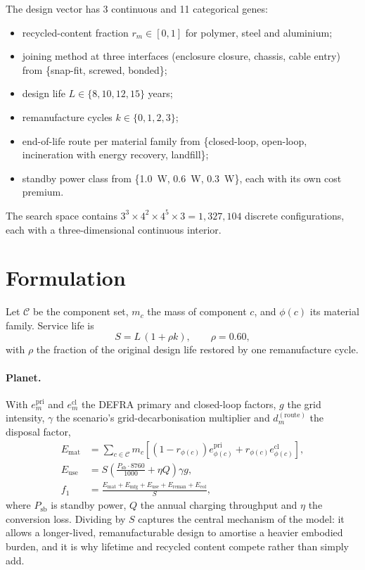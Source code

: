 \documentclass[11pt,a4paper]{article}
\begin{document}
The design vector has 3 continuous and 11 categorical genes:

\begin{itemize}
\item recycled-content fraction $r_m \in [0,1]$ for polymer, steel and
aluminium;
\item joining method at three interfaces (enclosure closure, chassis, cable
entry) from \{snap-fit, screwed, bonded\};
\item design life $L \in \{8, 10, 12, 15\}$ years;
\item remanufacture cycles $k \in \{0,1,2,3\}$;
\item end-of-life route per material family from \{closed-loop, open-loop,
incineration with energy recovery, landfill\};
\item standby power class from \{\SI{1.0}{\watt}, \SI{0.6}{\watt},
\SI{0.3}{\watt}\}, each with its own cost premium.
\end{itemize}

The search space contains $3^3 \times 4^2 \times 4^5 \times 3 =
1,327,104$ discrete configurations, each with a
three-dimensional continuous interior.

\FloatBarrier
\section{Formulation}

Let $\mathcal{C}$ be the component set, $m_c$ the mass of component $c$, and
$\phi(c)$ its material family. Service life is
\begin{equation}
S = L\,(1 + \rho k), \qquad \rho = 0.60,
\end{equation}
with $\rho$ the fraction of the original design life restored by one
remanufacture cycle.

\paragraph{Planet.} With $e^{\mathrm{pri}}_m$ and $e^{\mathrm{cl}}_m$ the DEFRA
primary and closed-loop factors, $g$ the grid intensity, $\gamma$ the
scenario's grid-decarbonisation multiplier and $d_m^{(\text{route})}$ the
disposal factor,
\begin{align}
E_{\text{mat}} &= \sum_{c \in \mathcal{C}} m_c \left[(1 - r_{\phi(c)})
  e^{\mathrm{pri}}_{\phi(c)} + r_{\phi(c)} e^{\mathrm{cl}}_{\phi(c)}\right], \\
E_{\text{use}} &= S \left(\tfrac{P_{\text{sb}} \cdot 8760}{1000}
  + \eta Q\right) \gamma g, \\
f_1 &= \frac{E_{\text{mat}} + E_{\text{mfg}} + E_{\text{use}}
  + E_{\text{reman}} + E_{\text{eol}}}{S},
\end{align}
where $P_{\text{sb}}$ is standby power, $Q$ the annual charging throughput and
$\eta$ the conversion loss. Dividing by $S$ captures the central mechanism of
the model: it allows a longer-lived, remanufacturable design to amortise a
heavier embodied burden, and it is why lifetime and recycled content compete
rather than simply add.
\end{document}
